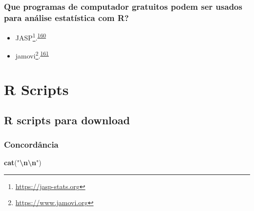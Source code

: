 \documentclass[
]{book}
\newenvironment{Shaded}{\begin{snugshade}}{\end{snugshade}}
\newcommand{\DecValTok}[1]{\textcolor[rgb]{0.00,0.00,0.81}{#1}}
\newcommand{\FunctionTok}[1]{\textcolor[rgb]{0.13,0.29,0.53}{\textbf{#1}}}
\newcommand{\NormalTok}[1]{#1}
\newcommand{\SpecialCharTok}[1]{\textcolor[rgb]{0.81,0.36,0.00}{\textbf{#1}}}
\newcommand{\StringTok}[1]{\textcolor[rgb]{0.31,0.60,0.02}{#1}}
\renewcommand{\href}[2]{#2\footnote{\url{#1}}}
\begin{document}
\hypertarget{que-programas-de-computador-gratuitos-podem-ser-usados-para-anuxe1lise-estatuxedstica-com-r}{%
\subsection{Que programas de computador gratuitos podem ser usados para análise estatística com R?}\label{que-programas-de-computador-gratuitos-podem-ser-usados-para-anuxe1lise-estatuxedstica-com-r}}

\begin{itemize}
\item
  \href{https://jasp-stats.org}{JASP}.\textsuperscript{\protect\hyperlink{ref-love2019}{160}}
\item
  \href{https://www.jamovi.org}{jamovi}.\textsuperscript{\protect\hyperlink{ref-sahin2020}{161}}
\end{itemize}

\hypertarget{scripts}{%
\chapter{\texorpdfstring{\textbf{R Scripts}}{R Scripts}}\label{scripts}}

\hypertarget{lista-scripts}{%
\section{R scripts para download}\label{lista-scripts}}

\begin{Shaded}
\end{Shaded}

\hypertarget{concordancia-1}{%
\subsection{Concordância}\label{concordancia-1}}

\begin{Shaded}
\begin{Highlighting}[]
\FunctionTok{cat}\NormalTok{(}\StringTok{"}\SpecialCharTok{\textbackslash{}n\textbackslash{}n}\StringTok{"}\NormalTok{)}
\end{Highlighting}
\end{Shaded}
\end{document}
